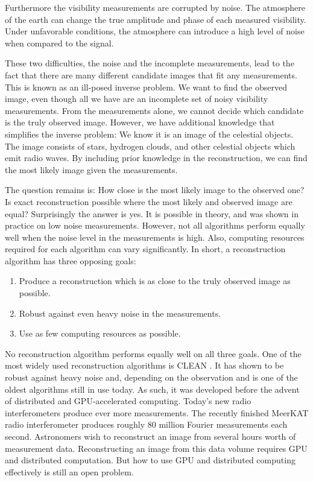 Furthermore the visibility measurements are corrupted by noise. The atmosphere of the earth can change the true amplitude and phase of each measured visibility. Under unfavorable conditions, the atmosphere can introduce a high level of noise when compared to the signal.

These two difficulties, the noise and the incomplete measurements, lead to the fact that there are many different candidate images that fit any measurements.  This is known as an ill-posed inverse problem. We want to find the observed image, even though all we have are an incomplete set of noisy visibility measurements. From the measurements alone, we cannot decide which candidate is the truly observed image. However, we have additional knowledge that simplifies the inverse problem: We know it is an image of the celestial objects. The image consists of stars, hydrogen clouds, and other celestial objects which emit radio waves. By including prior knowledge in the reconstruction, we can find the most likely image given the measurements. 

The question remains is: How close is the most likely image to the observed one? Is exact reconstruction possible where the most likely and observed image are equal? Surprisingly the answer is yes. It is possible in theory\cite{candes2006robust,donoho2006compressed}, and was shown in practice on low noise measurements\cite{dabbech2018cygnus, dabbech2015moresane}. However, not all algorithms perform equally well when the noise level in the measurements is high. Also, computing resources required for each algorithm can vary significantly. In short, a reconstruction algorithm has three opposing goals:
\begin{enumerate}
	\item Produce a reconstruction which is as close to the truly observed image as possible.
	\item Robust against even heavy noise in the measurements.
	\item Use as few computing resources as possible.
\end{enumerate}

No reconstruction algorithm performs equally well on all three goals. One of the most widely used reconstruction algorithms is CLEAN \cite{hogbom1974aperture, rau2011multi}. It has shown to be robust against heavy noise\cite{offringa2017optimized} and, depending on the observation and is one of the oldest algorithms still in use today. As such, it was developed before the advent of distributed and GPU-accelerated computing. Today's new radio interferometers produce ever more measurements. The recently finished MeerKAT radio interferometer produces roughly 80 million Fourier measurements each second. Astronomers wish to reconstruct an image from several hours worth of measurement data. Reconstructing an image from this data volume requires GPU and distributed computation. But how to use GPU and distributed computing effectively is still an open problem.

